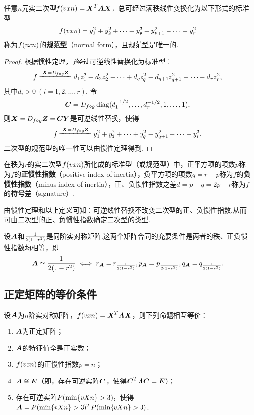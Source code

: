 \begin{corollary}
任意\(n\)元实二次型\(f(\v{x}{n}) = \x^T\A\x\)，总可经过满秩线性变换化为以下形式的标准型\[
f(\v{x}{n})
=y_1^2+y_2^2+ \dotsb +y_p^2
-y_{p+1}^2-\dotsb-y_r^2
\]称为\(f(\v{x}{n})\)的\textbf{规范型}（{\rm normal form}），且规范型是唯一的.
\begin{proof}
根据惯性定理，\(f\)经过可逆线性替换化为标准型：\[
f \xlongequal{\x=\D\z} d_1 z_1^2 + d_2 z_2^2 + \dotsb + d_q z_q^2 - d_{q+1} z_{q+1}^2 - \dotsb - d_r z_r^2,
\]其中\(d_i>0\ (i=1,2,\dotsc,r)\).
令\[
\C = \D \diag(d_1^{-1/2},\dotsc,d_r^{-1/2},1,\dotsc,1),
\]则\(\x = \D\z = \C\y\)是可逆线性替换，使得\[
f \xlongequal{\x=\D\z} y_1^2 + y_2^2 + \dotsb + y_q^2 - y_{q+1}^2 - \dotsb - y_r^2.
\]二次型的规范型的唯一性可以由惯性定理得到.
\end{proof}
\end{corollary}

\begin{definition}
在秩为\(r\)的实二次型\(f(\v{x}{n})\)所化成的标准型（或规范型）中，正平方项的项数\(p\)称为\(f\)的\textbf{正惯性指数}（positive index of inertia），负平方项的项数\(q=r-p\)称为\(f\)的\textbf{负惯性指数}（minus index of inertia），正、负惯性指数之差\(d=p-q=2p-r\)称为\(f\)的\textbf{符号差}（signature）.
\end{definition}
由惯性定理和以上定义可知：可逆线性替换不改变二次型的正、负惯性指数.从而可由二次型的正、负惯性指数确定二次型的类型.

\begin{theorem}
设\(\A\)和\(\B\)是同阶实对称矩阵.这两个矩阵合同的充要条件是两者的秩、正负惯性指数均相等，即\[
\A\simeq\B \iff r_{\A}=r_{\B}, p_{\A}=p_{\B}, q_{\A}=q_{\B}.
\]
\end{theorem}

\subsection{正定矩阵的等价条件}
\begin{theorem}
设\(\A\)为\(n\)阶实对称矩阵，\(f(\v{x}{n}) = \x^T\A\x\)，则下列命题相互等价：
\begin{enumerate}
\item \(\A\)为正定矩阵；
\item \(\A\)的特征值全是正实数；
\item \(f(\v{x}{n})\)的正惯性指数\(p=n\)；
\item \(\A \cong \E\)（即，存在可逆实阵\(\C\)，使得\(\C^T\A\C=\E\)）；
\item 存在可逆实阵\(\P\)，使得\(\A=\P^T\P\).
\end{enumerate}
\end{theorem}

